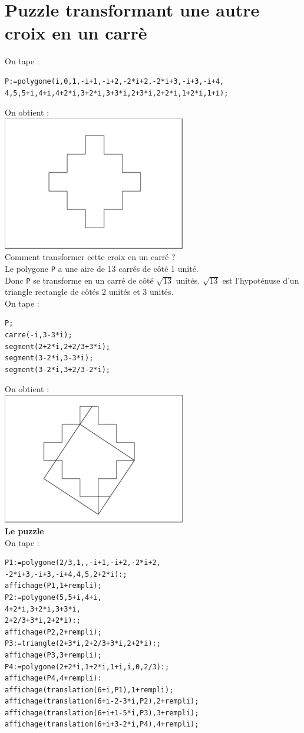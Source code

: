 \documentclass[a4paper,11pt]{book}
\begin{document}
\section{Puzzle transformant une autre croix en un carr\`e}
On tape :
\begin{verbatim}
P:=polygone(i,0,1,-i+1,-i+2,-2*i+2,-2*i+3,-i+3,-i+4,
4,5,5+i,4+i,4+2*i,3+2*i,3+3*i,2+3*i,2+2*i,1+2*i,1+i);
\end{verbatim}
On obtient :\\
\includegraphics[width=8cm]{puzzlecroix3}\\
Comment transformer cette croix en un carr\'e ?\\
Le polygone {\tt P} a une aire de 13 carr\'es de c\^ot\'e 1 unit\'e.\\
Donc {\tt P} se transforme en un carr\'e de c\^ot\'e $\sqrt{13}$ unit\'es.
$\sqrt{13}$ est l'hypot\'enuse d'un triangle rectangle de c\^ot\'es 2 unit\'es
et 3 unit\'es.\\
On tape :
\begin{verbatim}
P;
carre(-i,3-3*i);
segment(2+2*i,2+2/3+3*i);
segment(3-2*i,3-3*i);
segment(3-2*i,3+2/3-2*i);
\end{verbatim}
On obtient :\\
\includegraphics[width=8cm]{puzzlecroix4}\\
{\bf Le puzzle}\\
On tape :
\begin{verbatim}
P1:=polygone(2/3,1,,-i+1,-i+2,-2*i+2,
-2*i+3,-i+3,-i+4,4,5,2+2*i):;
affichage(P1,1+rempli);
P2:=polygone(5,5+i,4+i,
4+2*i,3+2*i,3+3*i,
2+2/3+3*i,2+2*i):;
affichage(P2,2+rempli);
P3:=triangle(2+3*i,2+2/3+3*i,2+2*i):;
affichage(P3,3+rempli);
P4:=polygone(2+2*i,1+2*i,1+i,i,0,2/3):;
affichage(P4,4+rempli):
affichage(translation(6+i,P1),1+rempli);
affichage(translation(6+i-2-3*i,P2),2+rempli);
affichage(translation(6+i+1-5*i,P3),3+rempli);
affichage(translation(6+i+3-2*i,P4),4+rempli);
\end{verbatim}
\end{document}
